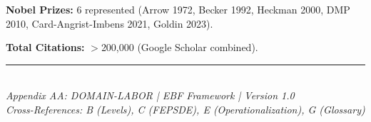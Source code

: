 \textbf{Nobel Prizes:} 6 represented (Arrow 1972, Becker 1992, Heckman 2000, DMP 2010, Card-Angrist-Imbens 2021, Goldin 2023).

\textbf{Total Citations:} $>$200,000 (Google Scholar combined).

\vfill
\begin{center}
\rule{0.8\textwidth}{0.4pt}\\[0.5em]
\textit{Appendix AA: DOMAIN-LABOR | EBF Framework | Version 1.0}\\
\textit{Cross-References: B (Levels), C (FEPSDE), E (Operationalization), G (Glossary)}
\end{center}

